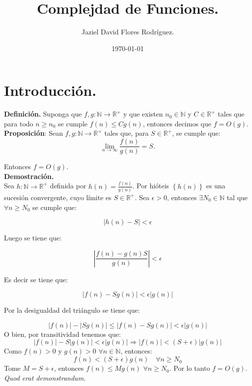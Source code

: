 \documentclass[12pt]{article}
\author{Jaziel David Flores Rodríguez.}
\date{\today}
\title{Complejdad de Funciones.}
\begin{document}
\maketitle

\section{Introducción.}
\textbf{Definición.} Suponga que $f,g:\mathbb{N}\rightarrow {\mathbb{R}}^{+}$ y que existen ${n}_{0}\in\mathbb{N}$  y $C\in{\mathbb{R}}^{+}$ tales que para todo $n\geq{n}_{0}$ se cumple $f(n)\leq Cg(n)$, entonces decimos que $f=O(g)$.\\

\textbf{Proposición}: Sean $f,g:\mathbb{N}\rightarrow {\mathbb{R}}^{+}$ tales que, para $S\in\mathbb{R}^{+}$, se cumple que:
\[
	\lim_{n\to\infty}\frac{f(n)}{g(n)} = S.
\]

Entonces $f=O(g)$.\\
\textbf{Demostración.}\\

Sea $h:\mathbb{N}\rightarrow {\mathbb{R}}^{+}$ definida por $h(n) = \frac{f(n)}{g(n)}$. Por hióteis $\left \{ h(n) \right \}$ es una sucesión convergente, cuyo límite es $S\in\mathbb{R}^{+}$. Sea $\epsilon > 0$, entonces $\exists{N}_{0} \in \mathbb{N}$ tal que $\forall n \geq {N}_{0}$ se cumple que: 

\[
	\left | h(n) - S \right | < \epsilon
\]

Luego se tiene que:

\[
	\left | \frac{f(n)-g(n)S}{g(n)} \right | < \epsilon
\]

Es decir se tiene que: 

\[
	\left | f(n)- Sg(n)\right | < \epsilon \left | g(n) \right |
\]

Por la desigualdad del triángulo se tiene que:

\[
\left| f(n) \right| - \left| Sg(n) \right| \leq \left | f(n)- Sg(n)\right | < \epsilon \left | g(n) \right |
\]
O bien, por transitividad tenemos que: 
\[
\left| f(n) \right| - S\left| g(n) \right| <  \epsilon \left | g(n) \right | \Rightarrow 
\left| f(n) \right| < (S+\epsilon)\left | g(n) \right |
\]
Como $f(n)>0$ y $g(n)>0$ $\forall n \in \mathbb{N}$, entonces: 
\[
	f(n)< (S+ \epsilon)g(n) \quad \forall n \geq {N}_{0}
\]
Tome $M=S+\epsilon$, entonces $f(n)\leq M g(n)$ $\forall n \geq {N}_{0}$. Por lo tanto $f=O(g)$. \\ \textit{Quod erat demonstrandum.}\\
\end{document}
